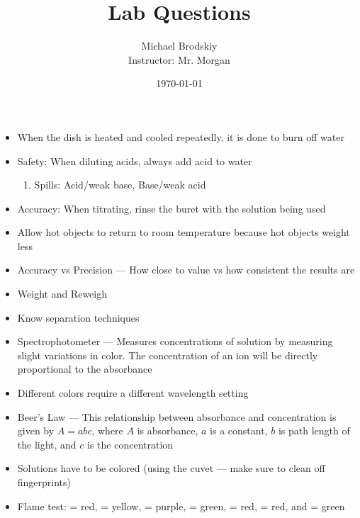 \documentclass[12pt]{article}
\title{Lab Questions}
\date{\today}
\author{Michael Brodskiy\\ \small Instructor: Mr. Morgan}
\begin{document}
\maketitle

\begin{itemize}

  \item When the dish is heated and cooled repeatedly, it is done to burn off water

  \item Safety: When diluting acids, always add acid to water

    \begin{enumerate}

      \item Spills: Acid/weak base, Base/weak acid

    \end{enumerate}

  \item Accuracy: When titrating, rinse the buret with the solution being used

  \item Allow hot objects to return to room temperature because hot objects weight less

  \item Accuracy vs Precision — How close to value vs how consistent the results are

  \item Weight and Reweigh

  \item Know separation techniques

  \item Spectrophotometer — Measures concentrations of solution by measuring slight variations in color. The concentration of an ion will be directly proportional to the absorbance

  \item Different colors require a different wavelength setting

  \item Beer's Law — This relationship between absorbance and concentration is given by $A=abc$, where $A$ is absorbance, $a$ is a constant, $b$ is path length of the light, and $c$ is the concentration

  \item Solutions have to be colored (using the cuvet — make sure to clean off fingerprints)

  \item Flame test:  = red,  = yellow,  = purple,  = green,  = red,  = red, and  = green


\end{itemize}
\end{document}
